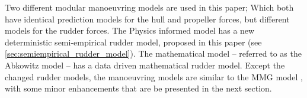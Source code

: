 Two different modular manoeuvring models are used in this paper; Which both have identical prediction models for the hull and propeller forces, but different models for the rudder forces. The Physics informed model has a new deterministic semi-empirical rudder model, proposed in this paper (see \autoref{sec:semiempirical_rudder_model}). The mathematical model -- referred to as the Abkowitz model -- has a data driven mathematical rudder model. 
Except the changed rudder models, the manoeuvring models are similar to the MMG model \citep{yasukawa_introduction_2015}, with some minor enhancements that are be presented in the next section.